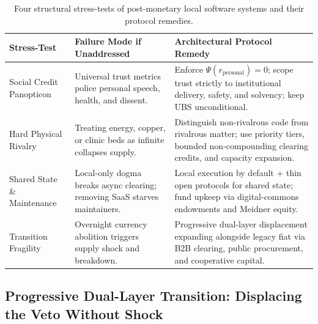 \documentclass[11pt]{article}
\begin{document}
\begin{table}[ht]
\centering
\small
\caption{Four structural stress-tests of post-monetary local software systems and their protocol remedies.}
\label{tab:stresstests}
\begin{tabularx}{\textwidth}{@{}P{2.85cm}P{4.15cm}Y@{}}
\toprule
Stress-Test & Failure Mode if Unaddressed & Architectural Protocol Remedy \\
\midrule
Social Credit Panopticon & Universal trust metrics police personal speech, health, and dissent. & Enforce $\Psi(r_{\mathrm{personal}})=0$; scope trust strictly to institutional delivery, safety, and solvency; keep UBS unconditional. \\
Hard Physical Rivalry & Treating energy, copper, or clinic beds as infinite collapses supply. & Distinguish non-rivalrous code from rivalrous matter; use priority tiers, bounded non-compounding clearing credits, and capacity expansion. \\
Shared State \& Maintenance & Local-only dogma breaks async clearing; removing SaaS starves maintainers. & Local execution by default + thin open protocols for shared state; fund upkeep via digital-commons endowments and Meidner equity. \\
Transition Fragility & Overnight currency abolition triggers supply shock and breakdown. & Progressive dual-layer displacement expanding alongside legacy fiat via B2B clearing, public procurement, and cooperative capital. \\
\bottomrule
\end{tabularx}
\end{table}

\subsection{Progressive Dual-Layer Transition: Displacing the Veto Without Shock}
\end{document}
